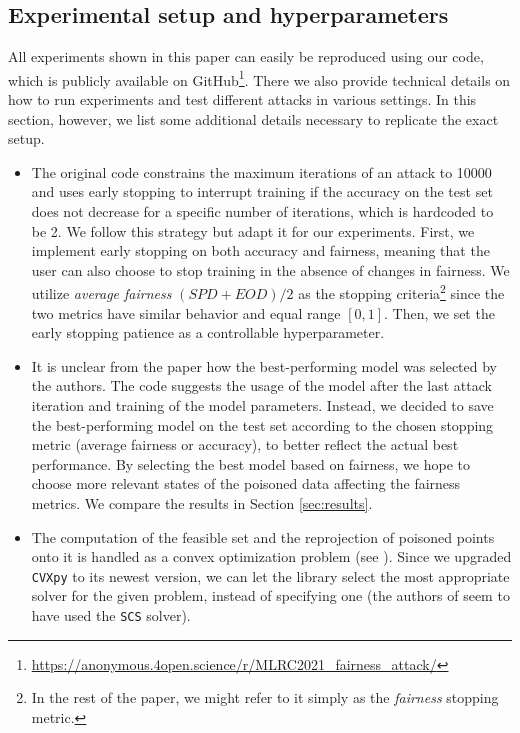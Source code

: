 \subsection{Experimental setup and hyperparameters}
All experiments shown in this paper can easily be reproduced using our code, which is publicly available on GitHub\footnote{\url{https://anonymous.4open.science/r/MLRC2021_fairness_attack/}}. There we also provide technical details on how to run experiments and test different attacks in various settings. In this section, however, we list some additional details necessary to replicate the exact setup. 
\begin{itemize}%
    
    \item The original code constrains the maximum iterations of an attack to 10000 and uses early stopping to interrupt training if the accuracy on the test set does not decrease for a specific number of iterations, which is hardcoded to be 2. We follow this strategy but adapt it for our experiments. First, we implement early stopping on both accuracy and fairness, meaning that the user can also choose to stop training in the absence of changes in fairness. We utilize \textit{average fairness} $(SPD+EOD)/2$ as the stopping criteria\footnote{In the rest of the paper, we might refer to it simply as the \textit{fairness} stopping metric.} since the two metrics have similar behavior and equal range $[0,1]$. Then, we set the early stopping patience as a controllable hyperparameter.
    
    \item It is unclear from the paper how the best-performing model was selected by the authors. The code suggests the usage of the model after the last attack iteration and training of the model parameters. Instead, we decided to save the best-performing model on the test set according to the chosen stopping metric (average fairness or accuracy), to better reflect the actual best performance. By selecting the best model based on fairness, we hope to choose more relevant states of the poisoned data affecting the fairness metrics. We compare the results in Section \ref{sec:results}.
    
    \item The computation of the feasible set and the reprojection of poisoned points onto it is handled as a convex optimization problem (see \cite{koh2018}). Since we upgraded \texttt{CVXpy} to its newest version, we can let the library select the most appropriate solver for the given problem, instead of specifying one (the authors of \cite{originalpaper} seem to have used the \texttt{SCS} solver).
    

\end{itemize}
